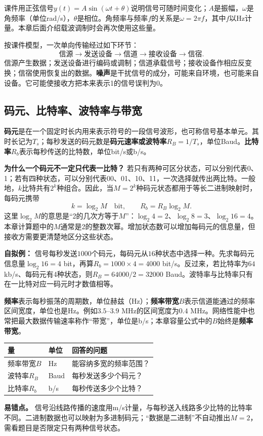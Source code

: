 课件用正弦信号$y(t)=A\sin(\omega t+\theta)$说明信号可随时间变化；$A$是振幅，$\omega$是角频率（单位rad/s），$\theta$是相位。角频率与频率$f$的关系是$\omega=2\pi f$，其中$f$以Hz计量。本章后面介绍载波调制时会再次使用这些量。

按课件模型，一次单向传输经过如下环节：
\[
\text{信源}\longrightarrow\text{发送设备}\longrightarrow\text{信道}
\longrightarrow\text{接收设备}\longrightarrow\text{信宿}.
\]
信源产生数据；发送设备进行编码或调制；信道承载信号；接收设备作相应反变换；信宿使用恢复出的数据。\textbf{噪声}是干扰信号的成分，可能来自环境，也可能来自设备。它可能使接收方把本来表示1的信号误判为0。
\annotationarea[4]

\subsection{码元、比特率、波特率与带宽}\label{sec:physical-rates}
\textbf{码元}是在一个固定时长内用来表示符号的一段信号波形，也可称信号基本单元。其时长记为$T_s$；每秒发送的码元数是\textbf{码元速率或波特率}$R_B=1/T_s$，单位Baud。\textbf{比特率}$R_b$表示每秒传送的比特数，单位bit/s或b/s。

\textbf{为什么一个码元不一定只代表一比特？} 若只有两种可区分状态，可以分别代表0、1；若有四种状态，可以分别代表00、01、10、11，一次选择就传出两比特。一般地，$k$比特共有$2^k$种组合。因此，当$M=2^k$种码元状态都用于等长二进制映射时，每码元携带
\[
 k=\log_2M\quad\text{bit},\qquad R_b=R_B\log_2M.
\]
这里$\log_2M$的意思是“2的几次方等于$M$”：$\log_2 4=2$、$\log_2 8=3$、$\log_2 16=4$。本章计算题中的$M$通常是2的整数次幂。增加状态数可以增加每码元的信息量，但接收方需要更清楚地区分这些状态。

\textbf{自拟例：} 信号每秒发送$1000$个码元，每码元从$16$种状态中选择一种。先求每码元信息量$\log_2 16=4$ bit，再算$R_b=1000\times4=4000$ bit/s。反过来，若比特率为$64$ kb/s、每码元有4种状态，则$R_B=64000/2=32000$ Baud。波特率与比特率只有在一比特对应一码元时才数值相等。

\textbf{频率}表示每秒振荡的周期数，单位赫兹（Hz）；\textbf{频率带宽}$B$表示信道能通过的频率区间宽度，单位也是Hz。例如$3.5$--$3.9$ MHz的区间宽度为$0.4$ MHz。网络性能中也常把最大数据传输速率称作“带宽”，单位是b/s；本章容量公式中的$B$始终是\textbf{频率带宽}。

\begin{center}
\begin{tabularx}{0.97\textwidth}{l l X}
\toprule
量 & 单位 & 回答的问题\\
\midrule
频率带宽$B$ & Hz & 能容纳多宽的频率范围？\\
波特率$R_B$ & Baud & 每秒发送多少个码元？\\
比特率$R_b$ & b/s & 每秒传送多少个比特？\\
\bottomrule
\end{tabularx}
\end{center}
\textbf{易错点。} 信号沿线路传播的速度用m/s计量，与每秒送入线路多少比特的比特率不同。二进制数据也可以映射为多进制码元；“数据是二进制”不自动推出$M=2$，需看题目是否限定只有两种信号状态。
\annotationarea[4]

